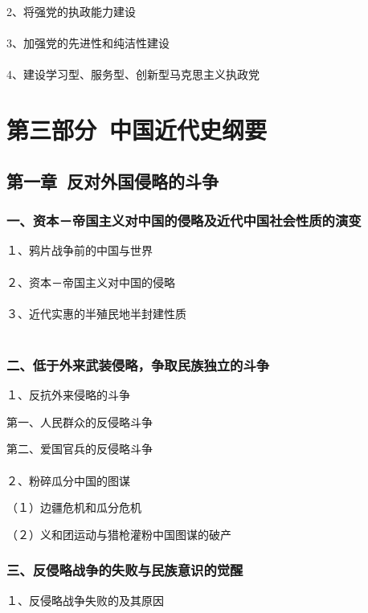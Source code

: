 \documentclass{ctexart}
\begin{document}
2、将强党的执政能力建设
\\\\

3、加强党的先进性和纯洁性建设
\\\\

4、建设学习型、服务型、创新型马克思主义执政党

\section{第三部分\ 中国近代史纲要}

\subsection{第一章\ 反对外国侵略的斗争}

\subsubsection{一、资本－帝国主义对中国的侵略及近代中国社会性质的演变}
１、鸦片战争前的中国与世界
\\\\

２、资本－帝国主义对中国的侵略
\\\\


３、近代实惠的半殖民地半封建性质
\\\\


\subsubsection{二、低于外来武装侵略，争取民族独立的斗争}
１、反抗外来侵略的斗争

第一、人民群众的反侵略斗争

第二、爱国官兵的反侵略斗争
\\\\

２、粉碎瓜分中国的图谋

（１）边疆危机和瓜分危机

（２）义和团运动与猎枪灌粉中国图谋的破产

\subsubsection{三、反侵略战争的失败与民族意识的觉醒}

１、反侵略战争失败的及其原因
\end{document}
